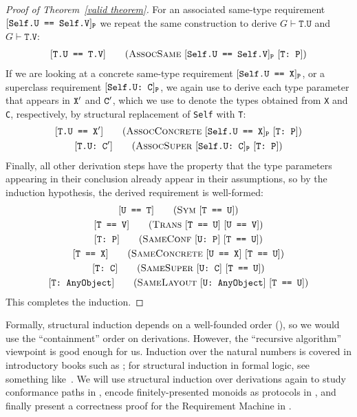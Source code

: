 \documentclass[../generics]{subfiles}
\begin{document}
\begin{proof}[Proof of Theorem~\ref*{valid theorem}]
For an associated same-type requirement $[\texttt{Self.U == Self.V}]_\texttt{P}$ we repeat the same construction to derive $G\vdash\texttt{T.U}$ and $G\vdash\texttt{T.V}$:
\begin{gather*}
\AssocSameStepDef
\end{gather*}
If we are looking at a concrete same-type requirement $[\texttt{Self.U == X}]_\texttt{P}$, or a superclass requirement $[\texttt{Self.U:~C}]_\texttt{P}$, we again use  to derive each type parameter that appears in $\texttt{X}^\prime$ and $\texttt{C}^\prime$, which we use to denote the types obtained from \texttt{X} and \texttt{C}, respectively, by structural replacement of \texttt{Self} with \texttt{T}:
\begin{gather*}
\AssocConcreteStepDef\\
\AssocSuperStepDef
\end{gather*}
Finally, all other derivation steps have the property that the type parameters appearing in their conclusion already appear in their assumptions, so by the induction hypothesis, the derived requirement is well-formed:
\begin{gather*}
\SymStepDef\\
\TransStepDef\\
\SameConfStepDef\\
\SameConcreteStepDef\\
\SameSuperStepDef\\
\SameLayoutStepDef
\end{gather*}
This completes the induction.
\end{proof}
Formally, structural induction depends on a well-founded order (), so we would use the ``containment'' order on derivations. However, the ``recursive algorithm'' viewpoint is good enough for us. Induction over the natural numbers is covered in introductory books such as \cite{grimaldi}; for structural induction in formal logic, see something like~\cite{bradley2007calculus}. We will use structural induction over derivations again to study conformance paths in , encode finitely-presented monoids as protocols in , and finally present a correctness proof for the Requirement Machine in .

\medskip
\end{document}
